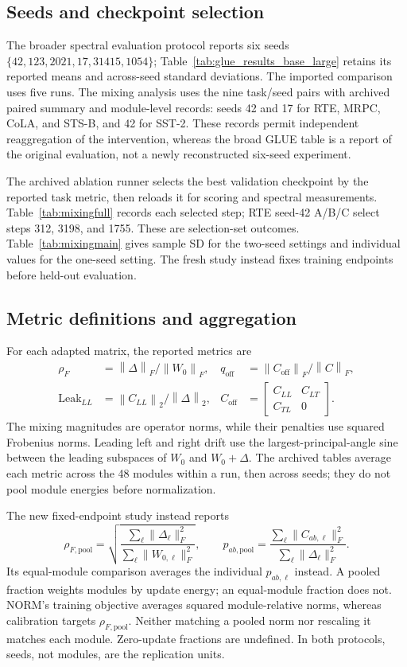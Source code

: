 \documentclass{article}
\newcommand{\off}{\mathrm{off}}
\newcommand{\op}[1]{\left\|#1\right\|_2}
\newcommand{\fro}[1]{\left\|#1\right\|_F}
\begin{document}
\subsection{Seeds and checkpoint selection}
The broader spectral evaluation protocol reports six seeds $\{42,123,2021,17,31415,1054\}$; Table~\ref{tab:glue_results_base_large} retains its reported means and across-seed standard deviations. The imported comparison uses five runs. The mixing analysis uses the nine task/seed pairs with archived paired summary and module-level records: seeds 42 and 17 for RTE, MRPC, CoLA, and STS-B, and 42 for SST-2. These records permit independent reaggregation of the intervention, whereas the broad GLUE table is a report of the original evaluation, not a newly reconstructed six-seed experiment.

The archived ablation runner selects the best validation checkpoint by the reported task metric, then reloads it for scoring and spectral measurements. Table~\ref{tab:mixingfull} records each selected step; RTE seed-42 A/B/C select steps 312, 3198, and 1755. These are selection-set outcomes. Table~\ref{tab:mixingmain} gives sample SD for the two-seed settings and individual values for the one-seed setting. The fresh study instead fixes training endpoints before held-out evaluation.

\subsection{Metric definitions and aggregation}
For each adapted matrix, the reported metrics are
\begin{align}
\rho_F&=\fro{\Delta}/\fro{W_0},&
q_{\off}&=\fro{C_{\off}}/\fro{C},\\
\mathrm{Leak}_{LL}&=\op{C_{LL}}/\op{\Delta},&
C_{\off}&=\begin{bmatrix}C_{LL}&C_{LT}\\C_{TL}&0\end{bmatrix}.
\end{align}
The mixing magnitudes are operator norms, while their penalties use squared Frobenius norms. Leading left and right drift use the largest-principal-angle sine between the leading subspaces of $W_0$ and $W_0+\Delta$. The archived tables average each metric across the 48 modules within a run, then across seeds; they do not pool module energies before normalization.

The new fixed-endpoint study instead reports
\begin{equation}
\rho_{F,\mathrm{pool}}=\sqrt{\frac{\sum_\ell\|\Delta_\ell\|_F^2}{\sum_\ell\|W_{0,\ell}\|_F^2}},\qquad
p_{ab,\mathrm{pool}}=\frac{\sum_\ell\|C_{ab,\ell}\|_F^2}{\sum_\ell\|\Delta_\ell\|_F^2}.
\label{eq:pooledmetrics}
\end{equation}
Its equal-module comparison averages the individual $p_{ab,\ell}$ instead. A pooled fraction weights modules by update energy; an equal-module fraction does not. NORM's training objective averages squared module-relative norms, whereas calibration targets $\rho_{F,\mathrm{pool}}$. Neither matching a pooled norm nor rescaling it matches each module. Zero-update fractions are undefined. In both protocols, seeds, not modules, are the replication units.
\end{document}
